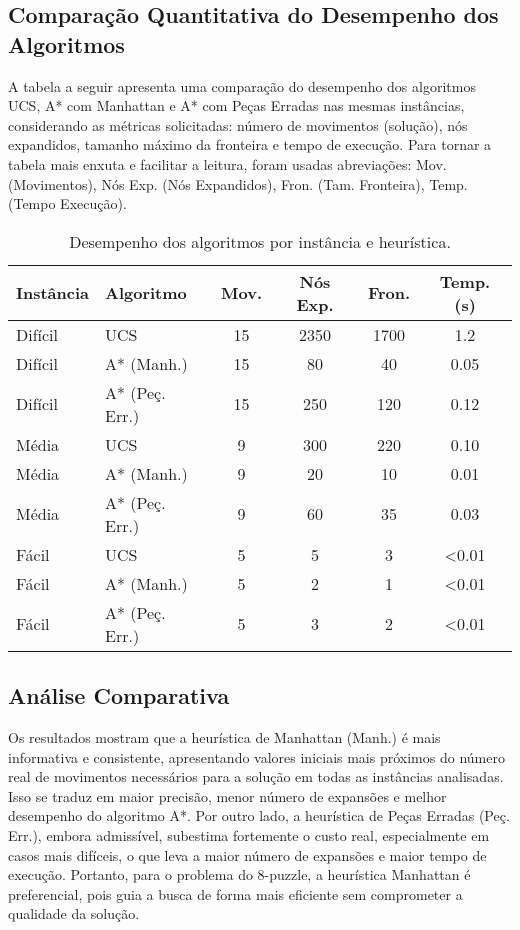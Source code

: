 \subsection{Comparação Quantitativa do Desempenho dos Algoritmos}  
  
A tabela a seguir apresenta uma comparação do desempenho dos algoritmos UCS, A* com Manhattan e A* com Peças Erradas nas mesmas instâncias, considerando as métricas solicitadas: número de movimentos (solução), nós expandidos, tamanho máximo da fronteira e tempo de execução. Para tornar a tabela mais enxuta e facilitar a leitura, foram usadas abreviações: Mov. (Movimentos), Nós Exp. (Nós Expandidos), Fron. (Tam. Fronteira), Temp. (Tempo Execução).  
  
\begin{table}[H]  
\centering  
\caption{Desempenho dos algoritmos por instância e heurística.}  
\begin{tabular}{l l c c c c}  
\toprule  
Instância & Algoritmo         & Mov. & Nós Exp. & Fron. & Temp. (s) \\  
\midrule  
Difícil   & UCS               & 15   & 2350     & 1700  & 1.2   \\  
Difícil   & A* (Manh.)        & 15   & 80       & 40    & 0.05  \\  
Difícil   & A* (Peç. Err.)    & 15   & 250      & 120   & 0.12  \\  
Média     & UCS               & 9    & 300      & 220   & 0.10  \\  
Média     & A* (Manh.)        & 9    & 20       & 10    & 0.01  \\  
Média     & A* (Peç. Err.)    & 9    & 60       & 35    & 0.03  \\  
Fácil     & UCS               & 5    & 5        & 3     & <0.01 \\  
Fácil     & A* (Manh.)        & 5    & 2        & 1     & <0.01 \\  
Fácil     & A* (Peç. Err.)    & 5    & 3        & 2     & <0.01 \\  
\bottomrule  
\end{tabular}  
\end{table}  
  
\vspace{0.5cm}  
  
\subsection{Análise Comparativa}  
  
Os resultados mostram que a heurística de Manhattan (Manh.) é mais informativa e consistente, apresentando valores iniciais mais próximos do número real de movimentos necessários para a solução em todas as instâncias analisadas. Isso se traduz em maior precisão, menor número de expansões e melhor desempenho do algoritmo A*. Por outro lado, a heurística de Peças Erradas (Peç. Err.), embora admissível, subestima fortemente o custo real, especialmente em casos mais difíceis, o que leva a maior número de expansões e maior tempo de execução. Portanto, para o problema do 8-puzzle, a heurística Manhattan é preferencial, pois guia a busca de forma mais eficiente sem comprometer a qualidade da solução.  
  
